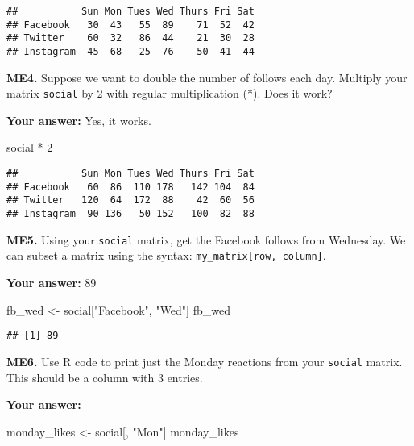 \documentclass[
]{article}
\newenvironment{Shaded}{\begin{snugshade}}{\end{snugshade}}
\newcommand{\DecValTok}[1]{\textcolor[rgb]{0.00,0.00,0.81}{#1}}
\newcommand{\NormalTok}[1]{#1}
\newcommand{\OtherTok}[1]{\textcolor[rgb]{0.56,0.35,0.01}{#1}}
\newcommand{\SpecialCharTok}[1]{\textcolor[rgb]{0.00,0.00,0.00}{#1}}
\newcommand{\StringTok}[1]{\textcolor[rgb]{0.31,0.60,0.02}{#1}}
\begin{document}
\begin{verbatim}
##           Sun Mon Tues Wed Thurs Fri Sat
## Facebook   30  43   55  89    71  52  42
## Twitter    60  32   86  44    21  30  28
## Instagram  45  68   25  76    50  41  44
\end{verbatim}

\textbf{ME4.} Suppose we want to double the number of follows each day.
Multiply your matrix \texttt{social} by 2 with regular multiplication
(*). Does it work?

\textbf{Your answer:} Yes, it works.

\begin{Shaded}
\begin{Highlighting}[]
\NormalTok{social }\SpecialCharTok{*} \DecValTok{2}
\end{Highlighting}
\end{Shaded}

\begin{verbatim}
##           Sun Mon Tues Wed Thurs Fri Sat
## Facebook   60  86  110 178   142 104  84
## Twitter   120  64  172  88    42  60  56
## Instagram  90 136   50 152   100  82  88
\end{verbatim}

\textbf{ME5.} Using your \texttt{social} matrix, get the Facebook
follows from Wednesday. We can subset a matrix using the syntax:
\texttt{my\_matrix{[}row,\ column{]}}.

\textbf{Your answer:} 89

\begin{Shaded}
\begin{Highlighting}[]
\NormalTok{fb\_wed }\OtherTok{\textless{}{-}}\NormalTok{ social[}\StringTok{"Facebook"}\NormalTok{, }\StringTok{"Wed"}\NormalTok{]}
\NormalTok{fb\_wed}
\end{Highlighting}
\end{Shaded}

\begin{verbatim}
## [1] 89
\end{verbatim}

\textbf{ME6.} Use R code to print just the Monday reactions from your
\texttt{social} matrix. This should be a column with 3 entries.

\textbf{Your answer:}

\begin{Shaded}
\begin{Highlighting}[]
\NormalTok{monday\_likes }\OtherTok{\textless{}{-}}\NormalTok{ social[, }\StringTok{"Mon"}\NormalTok{]}
\NormalTok{monday\_likes}
\end{Highlighting}
\end{Shaded}
\end{document}

